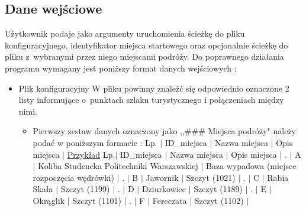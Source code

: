 \documentclass[10pt,oneside]{article}
\begin{document}
\subsection{Dane wejściowe}
Użytkownik podaje jako argumenty uruchomienia ścieżkę do pliku konfiguracyjnego, identyfikator miejsca startowego oraz opcjonalnie ścieżkę do pliku z~wybranymi przez niego miejscami podróży.
Do poprawnego działania programu wymagany jest poniższy format danych wejściowych :
\begin{itemize}
	\item Plik konfiguracyjny \newline W pliku powinny znale\'zć się odpowiednio oznaczone 2 listy informujące o~punktach szlaku turystycznego i połączeniach między nimi.
	\begin{itemize}
		\item Pierwszy zestaw danych oznaczony jako ,,\#\#\# Miejsca podróży" należy podać w poniższym formacie : \newline
		Lp. $\vert$ ID\_miejsca $\vert$ Nazwa miejsca $\vert$ Opis miejsca $\vert$
		\newline \newline
		\underline{Przykład}
		\newline \newline
		Lp.$\vert$ ID\_miejsca $\vert$ Nazwa miejsca $\vert$ Opis miejsca $\vert$ . $\vert$ A $\vert$ Koliba Studencka Politechniki Warszawskiej $\vert$ Baza wypadowa (miejsce rozpoczęcia wędrówki) $\vert$ . $\vert$ B $\vert$ Jawornik $\vert$ Szczyt (1021) $\vert$ . $\vert$ C $\vert$ Rabia Skała $\vert$ Szczyt (1199) $\vert$ . $\vert$ D $\vert$ Dziurkowiec $\vert$ Szczyt (1189) $\vert$ . $\vert$ E $\vert$ Okrąglik $\vert$ Szczyt (1101) $\vert$ . $\vert$ F $\vert$ Fereczata $\vert$ Szczyt (1102) $\vert$ \newline
		

\end{itemize}
\end{itemize}
\end{document}
